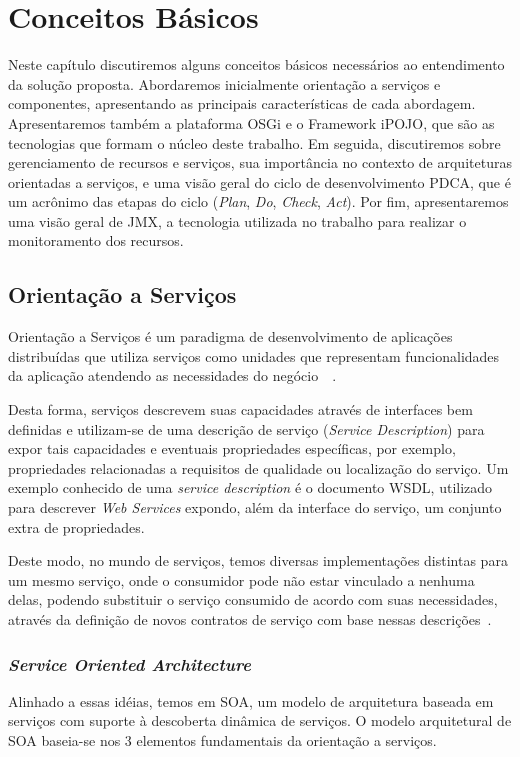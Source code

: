 \chapter{Conceitos Básicos}
\label{ch:2}
Neste capítulo discutiremos alguns conceitos básicos necessários ao entendimento da solução proposta. Abordaremos inicialmente orientação a serviços e componentes, apresentando as principais características de cada abordagem. Apresentaremos também a plataforma OSGi e o Framework iPOJO, que são as tecnologias que formam o núcleo deste trabalho. Em seguida, discutiremos sobre gerenciamento de recursos e serviços, sua importância no contexto de arquiteturas orientadas a serviços, e uma visão geral do ciclo de desenvolvimento PDCA, que é um acrônimo das etapas do ciclo (\textit{Plan}, \textit{Do}, \textit{Check}, \textit{Act}). Por fim, apresentaremos uma visão geral de JMX, a tecnologia utilizada no trabalho para realizar o monitoramento dos recursos.

\section{Orientação a Serviços}
\label{sec:service}

Orientação a Serviços é um paradigma de desenvolvimento de aplicações distribuídas que utiliza serviços como unidades que representam funcionalidades da aplicação atendendo as necessidades do negócio~\cite{erl2008soa}~\cite{cervantes2005technical}. 

Desta forma, serviços descrevem suas capacidades através de interfaces bem definidas e utilizam-se de uma descrição de serviço (\textit{Service Description}) para expor tais capacidades e eventuais propriedades específicas, por exemplo, propriedades relacionadas a requisitos de qualidade ou localização do serviço. Um exemplo conhecido de uma \textit{service description} é o documento WSDL, utilizado para descrever \textit{Web Services} expondo, além da interface do serviço, um conjunto extra de propriedades.

Deste modo, no mundo de serviços, temos diversas implementações distintas para um mesmo serviço, onde o consumidor pode não estar vinculado a nenhuma delas, podendo substituir o serviço consumido de acordo com suas necessidades, através da definição de novos contratos de serviço com base nessas descrições~\cite{cervantes2005technical}.

\subsection{\textit{Service Oriented Architecture}}
Alinhado a essas idéias, temos em SOA, um modelo de arquitetura baseada em serviços com suporte à descoberta dinâmica de serviços. O modelo arquitetural de SOA baseia-se nos 3 elementos fundamentais da orientação a serviços.

